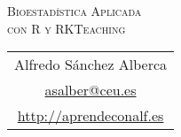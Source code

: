 \begin{titlepage}
\vspace*{7cm}
\par
\centering
\normalfont\fontsize{30}{30}\selectfont
\textsc{\color{blueceu}Bioestadística Aplicada\\ con R y RKTeaching}
\par  
\vspace*{3cm}
{\Large
\begin{tabular}{c}
Alfredo Sánchez Alberca\\
\url{asalber@ceu.es}\\
\url{http://aprendeconalf.es}
\end{tabular}
}
\par
\vfill
\end{titlepage}

